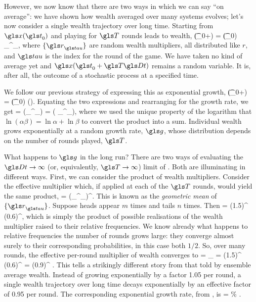 However, we now know that there are two ways in which we can say ``on average'': we have shown how wealth averaged over many systems evolves; let's now consider a single wealth trajectory over long time. Starting from $\x(\t_0)$ and playing for $\T$ rounds leads to wealth,
\be
\x(\t_0+\T\Dt) = \x(\t_0) \prod_{}^\T \gr_\gtau,
\ee
where $\{\gr_\gtau\}$ are random wealth multipliers, all distributed like $r$, and $\gtau$ is the index for the round of the game. We have taken no kind of average yet and $\x(\t_0+\T\Dt)$ remains a random variable. It is, after all, the outcome of a stochastic process at a specified time.

We follow our previous strategy of expressing this as exponential growth,
\be
\x(\t_0+\Dt) = \x(\t_0) \exp(\g\Dt).
\ee
Equating the two expressions and rearranging for the growth rate, we get
\be
\g =  \ln\left(\prod_{}^\T \gr_\gtau\right) =  \left( \sum_{}^\T \ln\gr_\gtau\right),
\ee
where we used the unique property of the logarithm that $\ln(\alpha\beta) = \ln\alpha + \ln\beta$ to convert the product into a sum. Individual wealth grows exponentially at a random growth rate, $\g$, whose distribution depends on the number of rounds played, $\T$.

What happens to $\g$ in the long run? There are two ways of evaluating the $\Dt\to\infty$ (or, equivalently, $\T\to\infty$) limit of . Both are illuminating in different ways. First, we can consider the product of wealth multipliers. Consider the effective multiplier which, if applied at each of the $\T$ rounds, would yield the same product, \ie
\be
\greff = \left(\prod_{}^\T \gr_\gtau\right)^.
\ee
This is known as the \textit{geometric mean} of $\{\gr_\gtau\}$. Suppose heads appear $m$ times and tails $n$ times. Then
\be
\greff = (1.5)^ (0.6)^,
\ee
which is simply the product of possible realisations of the wealth multiplier raised to their relative frequencies. We know already what happens to relative frequencies the number of rounds grows large: they converge almost surely to their corresponding probabilities, in this case both $1/2$. So, over many rounds, the effective per-round multiplier of wealth converges to
\be
\grtime = \lim_{\T\to\infty} \greff = (1.5)^ (0.6)^ = (0.9)^  .
\ee
This tells a strikingly different story from that told by ensemble average wealth. Instead of growing exponentially by a factor 1.05 per round, a single wealth trajectory over long time decays exponentially by an effective factor of 0.95 per round. The corresponding exponential growth rate, from , is
\be
\ggtime = \frac{\ln\grtime}{\dt} \% .
\ee

